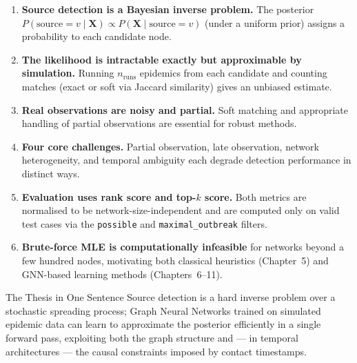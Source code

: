 \begin{enumerate}
    \item \textbf{Source detection is a Bayesian inverse problem.} The
    posterior $P(\text{source}=v \mid \mathbf{X}) \propto
    P(\mathbf{X} \mid \text{source}=v)$ (under a uniform prior) assigns a
    probability to each candidate node.

    \item \textbf{The likelihood is intractable exactly but approximable by
    simulation.} Running $n_{\text{runs}}$ epidemics from each candidate and
    counting matches (exact or soft via Jaccard similarity) gives an unbiased
    estimate.

    \item \textbf{Real observations are noisy and partial.} Soft matching
    and appropriate handling of partial observations are essential for
    robust methods.

    \item \textbf{Four core challenges.} Partial observation, late
    observation, network heterogeneity, and temporal ambiguity each degrade
    detection performance in distinct ways.

    \item \textbf{Evaluation uses rank score and top-$k$ score.} Both
    metrics are normalised to be network-size-independent and are computed
    only on valid test cases via the \texttt{possible} and
    \texttt{maximal\_outbreak} filters.

    \item \textbf{Brute-force MLE is computationally infeasible} for
    networks beyond a few hundred nodes, motivating both classical heuristics
    (Chapter~5) and GNN-based learning methods (Chapters~6--11).
\end{enumerate}

\begin{keyinsight}{The Thesis in One Sentence}
Source detection is a hard inverse problem over a stochastic spreading
process; Graph Neural Networks trained on simulated epidemic data can learn
to approximate the posterior efficiently in a single forward pass, exploiting
both the graph structure and — in temporal architectures — the causal
constraints imposed by contact timestamps.
\end{keyinsight}
